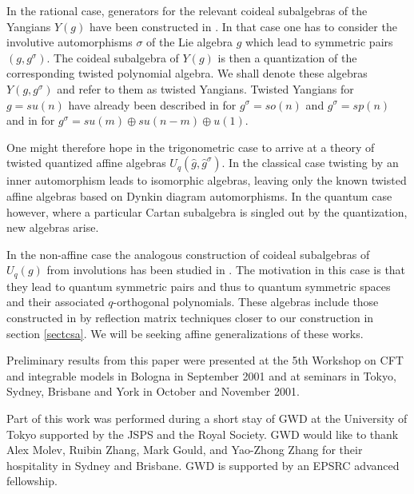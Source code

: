 \documentclass[a4paper,12pt]{article}
\numberwithin{equation}{section}
\begin{document}
In the rational case, generators for the relevant coideal
subalgebras of the Yangians $Y(g)$ have been constructed in
\cite{Del01}. In that case one has to consider the involutive
automorphisms $\sigma$ of the Lie algebra $g$ which lead to
symmetric pairs $(g,g^\sigma)$. The coideal subalgebra of $Y(g)$
is then a quantization of the corresponding twisted polynomial
algebra. We shall denote these algebras $Y(g,g^\sigma)$ and refer
to them as twisted Yangians. Twisted Yangians for $g=su(n)$ have
already been described in \cite{Mol96} for $g^\sigma=so(n)$ and
$g^\sigma=sp(n)$ and in \cite{Min99} for $g^\sigma=su(m)\oplus
su(n-m)\oplus u(1)$.

One might therefore hope in the trigonometric case to arrive at a
theory of twisted quantized affine algebras
$U_q(\hat{g},\hat{g}^\sigma)$. In the classical case twisting by
an inner automorphism leads to isomorphic algebras, leaving only
the known twisted affine algebras based on Dynkin diagram
automorphisms. In the quantum case however, where a particular
Cartan subalgebra is singled out by the quantization, new algebras
arise.

In the non-affine case the analogous construction of coideal
subalgebras of $U_q(g)$ from involutions has been studied in
\cite{Let01}. The motivation in this case is that they lead to
quantum symmetric pairs and thus to quantum symmetric spaces and
their associated $q$-orthogonal polynomials. These algebras
include those constructed in \cite{Nou} by reflection matrix
techniques closer to our construction in section \ref{sectcsa}. We
will be seeking affine generalizations of these works.

Preliminary results from this paper were presented at the 5th
Workshop on CFT and integrable models in Bologna in September 2001
and at seminars in Tokyo, Sydney, Brisbane and York in October and
November 2001.



Part of this work was performed during a short stay of GWD at the
University of Tokyo supported by the JSPS and the Royal Society.
GWD would like to thank Alex Molev, Ruibin Zhang, Mark Gould, and
Yao-Zhong Zhang for their hospitality in Sydney and Brisbane. GWD
is supported by an EPSRC advanced fellowship.
\end{document}
